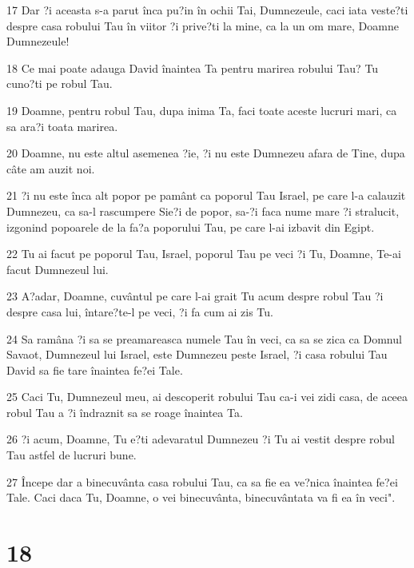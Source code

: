 \par 17 Dar ?i aceasta s-a parut înca pu?in în ochii Tai, Dumnezeule, caci iata veste?ti despre casa robului Tau în viitor ?i prive?ti la mine, ca la un om mare, Doamne Dumnezeule!
\par 18 Ce mai poate adauga David înaintea Ta pentru marirea robului Tau? Tu cuno?ti pe robul Tau.
\par 19 Doamne, pentru robul Tau, dupa inima Ta, faci toate aceste lucruri mari, ca sa ara?i toata marirea.
\par 20 Doamne, nu este altul asemenea ?ie, ?i nu este Dumnezeu afara de Tine, dupa câte am auzit noi.
\par 21 ?i nu este înca alt popor pe pamânt ca poporul Tau Israel, pe care l-a calauzit Dumnezeu, ca sa-l rascumpere Sie?i de popor, sa-?i faca nume mare ?i stralucit, izgonind popoarele de la fa?a poporului Tau, pe care l-ai izbavit din Egipt.
\par 22 Tu ai facut pe poporul Tau, Israel, poporul Tau pe veci ?i Tu, Doamne, Te-ai facut Dumnezeul lui.
\par 23 A?adar, Doamne, cuvântul pe care l-ai grait Tu acum despre robul Tau ?i despre casa lui, întare?te-l pe veci, ?i fa cum ai zis Tu.
\par 24 Sa ramâna ?i sa se preamareasca numele Tau în veci, ca sa se zica ca Domnul Savaot, Dumnezeul lui Israel, este Dumnezeu peste Israel, ?i casa robului Tau David sa fie tare înaintea fe?ei Tale.
\par 25 Caci Tu, Dumnezeul meu, ai descoperit robului Tau ca-i vei zidi casa, de aceea robul Tau a ?i îndraznit sa se roage înaintea Ta.
\par 26 ?i acum, Doamne, Tu e?ti adevaratul Dumnezeu ?i Tu ai vestit despre robul Tau astfel de lucruri bune.
\par 27 Începe dar a binecuvânta casa robului Tau, ca sa fie ea ve?nica înaintea fe?ei Tale. Caci daca Tu, Doamne, o vei binecuvânta, binecuvântata va fi ea în veci".

\chapter{18}

